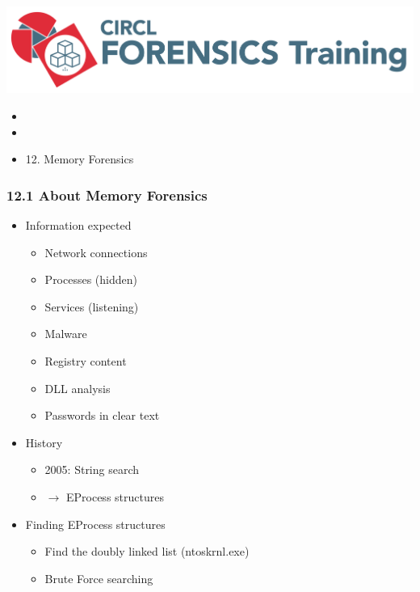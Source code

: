 

\begin{frame}
    \includegraphics[scale=0.3]{images/logo-circl-Forensics.png}
    \begin{itemize}
        \item[]
        \item[]
        \item[] 12. Memory Forensics
    \end{itemize}
\end{frame}


\begin{frame}
  \frametitle{12.1 About Memory Forensics}
    \begin{itemize}
        \item Information expected
            \begin{itemize}
                \item Network connections
		\item Processes (hidden)
		\item Services (listening)
                \item Malware
                \item Registry content
                \item DLL analysis
                \item Passwords in clear text
            \end{itemize}
        \item History
            \begin{itemize}
                \item 2005: String search
		\item $\to$ EProcess structures
            \end{itemize}
        \item Finding EProcess structures
            \begin{itemize}
		\item Find the doubly linked list (ntoskrnl.exe)
		\item Brute Force searching
            \end{itemize}
    \end{itemize}
\end{frame}


